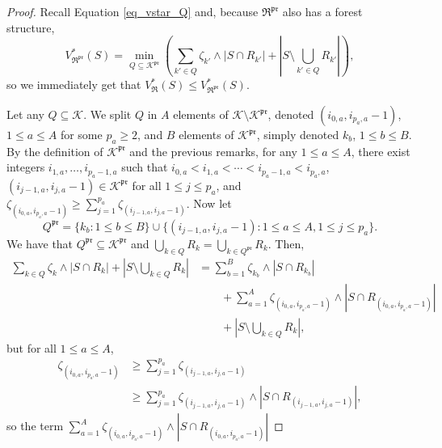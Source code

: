 \documentclass[
  11pt,
  a4paper,
]{article}
\theoremstyle{plain}
\theoremstyle{plain}
\theoremstyle{plain}
\theoremstyle{definition}
\theoremstyle{definition}
\theoremstyle{remark}
\begin{document}
\begin{proof}
Recall Equation \eqref{eq_vstar_Q} and, because
\(\mathfrak{R}^{\mathfrak{pr}}\) also has a forest structure,
\begin{equation}
V^*_{\mathfrak{R}^{\mathfrak{pr}}}(S)=\min_{Q\subseteq\mathcal{K}^{\mathfrak{pr}}}\left(\sum_{k'\in Q}\zeta_{k'}\wedge|S\cap R_{k'}|+\left| S\setminus\bigcup_{k'\in Q} R_{k'}   \right|\right),
\label{eq_vstarpruned_Q}
\end{equation} so we immediately get that
\(V^*_{\mathfrak{R}}(S)\leq V^*_{\mathfrak{R}^{\mathfrak{pr}}}(S)\).

Let any \(Q\subseteq \mathcal{K}\). We split \(Q\) in \(A\) elements of
\(\mathcal{K}\setminus\mathcal{K}^{\mathfrak{pr}}\), denoted
\((i_{0,a}, i_{p_a,a}-1)\), \(1\leq a\leq A\) for some \(p_a\geq2\), and
\(B\) elements of \(\mathcal{K}^{\mathfrak{pr}}\), simply denoted
\(k_b\), \(1\leq b\leq B\). By the definition of
\(\mathcal{K}^{\mathfrak{pr}}\) and the previous remarks, for any
\(1\leq a \leq A\), there exist integers \(i_{1,a},\dotsc,i_{p_a-1,a}\)
such that \(i_{0,a}<i_{1,a}<\dotsb<i_{p_a-1,a} < i_{p_a,a}\),
\((i_{j-1,a},i_{j,a}-1)\in\mathcal{K}^{\mathfrak{pr}}\) for all
\(1\leq j\leq p_a\), and
\(\zeta_{(i_{0,a}, i_{p_a,a}-1)}\geq \sum_{j=1}^{p_a}\zeta_{(i_{j-1,a},i_{j,a}-1)}\).
Now let \begin{equation}
Q^{\mathfrak{pr}}=\{k_b : 1\leq b\leq B \} \cup \{ (i_{j-1,a},i_{j,a}-1) :  1\leq a\leq A, 1\leq j\leq p_a  \}.
\label{eq_Qpr}
\end{equation} We have that
\(Q^{\mathfrak{pr}}\subseteq \mathcal{K}^{\mathfrak{pr}}\) and
\(\bigcup_{k\in Q}R_k=\bigcup_{k\in Q^{\mathfrak{pr}}}R_k\). Then,
\begin{align*}
\sum_{k\in Q}\zeta_k\wedge|S\cap R_k|+\left| S\setminus\bigcup_{k\in Q} R_k   \right|&=\sum_{b=1}^B\zeta_{k_b}\wedge|S\cap R_{k_b}| \\
&\qquad+\sum_{a=1}^A\zeta_{(i_{0,a}, i_{p_a,a}-1)}\wedge |S\cap R_{(i_{0,a}, i_{p_a,a}-1)}| \\
&\qquad+ \left| S\setminus\bigcup_{k\in Q} R_k   \right|    , 
\end{align*} but for all \(1\leq a\leq A\), \begin{align*}
\zeta_{(i_{0,a}, i_{p_a,a}-1)}&\geq  \sum_{j=1}^{p_a}\zeta_{(i_{j-1,a},i_{j,a}-1)} \\
&\geq   \sum_{j=1}^{p_a}\zeta_{(i_{j-1,a},i_{j,a}-1)} \wedge |S\cap R_{(i_{j-1,a}, i_{j,a}-1)}| ,
\end{align*} so the term
\(\sum_{a=1}^A\zeta_{(i_{0,a}, i_{p_a,a}-1)}\wedge |S\cap R_{(i_{0,a}, i_{p_a,a}-1)}|\)

\end{proof}
\end{document}
